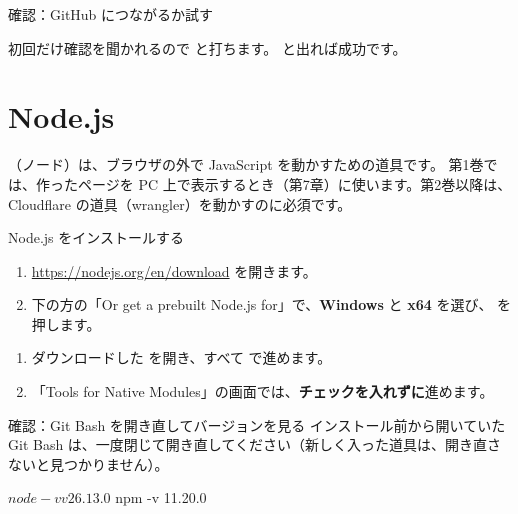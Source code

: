 \begin{step}{確認：GitHub につながるか試す}
初回だけ確認を聞かれるので  と打ちます。 と出れば成功です。
\end{step}

\section{Node.js}

（ノード）は、ブラウザの外で JavaScript を動かすための道具です。
第1巻では、作ったページを PC 上で表示するとき（第7章）に使います。第2巻以降は、Cloudflare の道具（wrangler）を動かすのに必須です。

\begin{step}{Node.js をインストールする}
\begin{enumerate}
  \item \url{https://nodejs.org/en/download} を開きます。
  \item 下の方の「Or get a prebuilt Node.js for」で、\textbf{Windows} と \textbf{x64} を選び、 を押します。
\end{enumerate}
\begin{enumerate}[resume]
  \item ダウンロードした  を開き、すべて  で進めます。
  \item 「Tools for Native Modules」の画面では、\textbf{チェックを入れずに}進めます。
\end{enumerate}
\end{step}

\begin{step}{確認：Git Bash を開き直してバージョンを見る}
インストール前から開いていた Git Bash は、一度閉じて開き直してください（新しく入った道具は、開き直さないと見つかりません）。
\begin{terminal}
$ node -v
v26.13.0
$ npm -v
11.20.0
\end{terminal}
\end{step}

